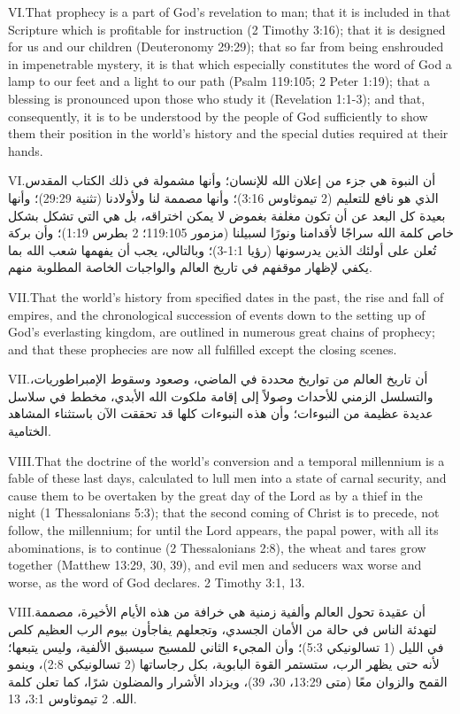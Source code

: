 \lettrine{VI.} That prophecy is a part of God’s revelation to man; that it is included in that Scripture which is profitable for instruction (2 Timothy 3:16); that it is designed for us and our children (Deuteronomy 29:29); that so far from being enshrouded in impenetrable mystery, it is that which especially constitutes the word of God a lamp to our feet and a light to our path (Psalm 119:105; 2 Peter 1:19); that a blessing is pronounced upon those who study it (Revelation 1:1-3); and that, consequently, it is to be understood by the people of God sufficiently to show them their position in the world’s history and the special duties required at their hands.


\lettrine{VI.} أن النبوة هي جزء من إعلان الله للإنسان؛ وأنها مشمولة في ذلك الكتاب المقدس الذي هو نافع للتعليم (2 تيموثاوس 3:16)؛ وأنها مصممة لنا ولأولادنا (تثنية 29:29)؛ وأنها بعيدة كل البعد عن أن تكون مغلفة بغموض لا يمكن اختراقه، بل هي التي تشكل بشكل خاص كلمة الله سراجًا لأقدامنا ونورًا لسبيلنا (مزمور 119:105؛ 2 بطرس 1:19)؛ وأن بركة تُعلن على أولئك الذين يدرسونها (رؤيا 1:1-3)؛ وبالتالي، يجب أن يفهمها شعب الله بما يكفي لإظهار موقفهم في تاريخ العالم والواجبات الخاصة المطلوبة منهم.


\lettrine{VII.} That the world’s history from specified dates in the past, the rise and fall of empires, and the chronological succession of events down to the setting up of God’s everlasting kingdom, are outlined in numerous great chains of prophecy; and that these prophecies are now all fulfilled except the closing scenes.


\lettrine{VII.} أن تاريخ العالم من تواريخ محددة في الماضي، وصعود وسقوط الإمبراطوريات، والتسلسل الزمني للأحداث وصولاً إلى إقامة ملكوت الله الأبدي، مخطط في سلاسل عديدة عظيمة من النبوءات؛ وأن هذه النبوءات كلها قد تحققت الآن باستثناء المشاهد الختامية.


\lettrine{VIII.} That the doctrine of the world’s conversion and a temporal millennium is a fable of these last days, calculated to lull men into a state of carnal security, and cause them to be overtaken by the great day of the Lord as by a thief in the night (1 Thessalonians 5:3); that the second coming of Christ is to precede, not follow, the millennium; for until the Lord appears, the papal power, with all its abominations, is to continue (2 Thessalonians 2:8), the wheat and tares grow together (Matthew 13:29, 30, 39), and evil men and seducers wax worse and worse, as the word of God declares. 2 Timothy 3:1, 13.


\lettrine{VIII.} أن عقيدة تحول العالم وألفية زمنية هي خرافة من هذه الأيام الأخيرة، مصممة لتهدئة الناس في حالة من الأمان الجسدي، وتجعلهم يفاجأون بيوم الرب العظيم كلص في الليل (1 تسالونيكي 5:3)؛ وأن المجيء الثاني للمسيح سيسبق الألفية، وليس يتبعها؛ لأنه حتى يظهر الرب، ستستمر القوة البابوية، بكل رجاساتها (2 تسالونيكي 2:8)، وينمو القمح والزوان معًا (متى 13:29، 30، 39)، ويزداد الأشرار والمضلون شرًا، كما تعلن كلمة الله. 2 تيموثاوس 3:1، 13.


